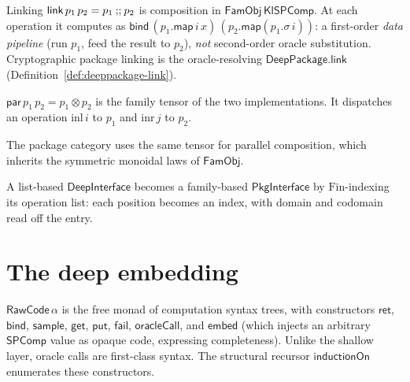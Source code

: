 \begin{definition}
  \label{def:pkgimpl-link}
  \leanok
  Linking $\mathsf{link}\,p_1\,p_2 = p_1 \fatsemi p_2$ is composition in
  $\mathsf{FamObj}\,\mathsf{KlSPComp}$. At each operation it computes as
  $\mathsf{bind}\,(p_1.\mathsf{map}\,i\,x)\,(p_2.\mathsf{map}(p_1.\sigma\,i))$:
  a first-order \emph{data pipeline} (run $p_1$, feed the result to $p_2$),
  \emph{not} second-order oracle substitution. Cryptographic package linking is
  the oracle-resolving $\mathsf{DeepPackage.link}$
  (Definition~\ref{def:deeppackage-link}).
\end{definition}

\begin{definition}
  \label{def:pkgimpl-par}
  \leanok
  $\mathsf{par}\,p_1\,p_2 = p_1 \otimes p_2$ is the family tensor of the two
  implementations. It dispatches an operation $\mathrm{inl}\,i$ to $p_1$ and
  $\mathrm{inr}\,j$ to $p_2$.
\end{definition}

The package category uses the same tensor for parallel composition, which inherits the
symmetric monoidal laws of $\mathsf{FamObj}$.

\begin{definition}
  \label{def:deepinterface-topkg}
  \leanok
  A list-based $\mathsf{DeepInterface}$ becomes a family-based
  $\mathsf{PkgInterface}$ by $\mathrm{Fin}$-indexing its operation list: each
  position becomes an index, with domain and codomain read off the entry.
\end{definition}

\section{The deep embedding}

\begin{definition}
  \label{def:rawcode}
  \leanok
  $\mathsf{RawCode}\,\alpha$ is the free monad of computation syntax trees,
  with constructors $\mathsf{ret}$, $\mathsf{bind}$, $\mathsf{sample}$,
  $\mathsf{get}$, $\mathsf{put}$, $\mathsf{fail}$, $\mathsf{oracleCall}$, and
  $\mathsf{embed}$ (which injects an arbitrary $\mathsf{SPComp}$ value as opaque
  code, expressing completeness). Unlike the shallow layer, oracle calls are
  first-class syntax. The structural recursor $\mathsf{inductionOn}$ enumerates
  these constructors.
\end{definition}

